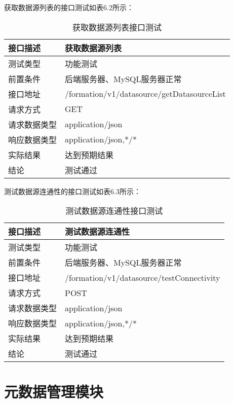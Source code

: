 获取数据源列表的接口测试如表6.2所示：

\begin{table}[h]
  \centering
  \caption{获取数据源列表接口测试}
  \label{tab:exampletable}
  \begin{tabular}{ll}
    \toprule
    接口描述         & 获取数据源列表         \\
    \midrule
    测试类型         & 功能测试         \\
    前置条件         & 后端服务器、MySQL服务器正常         \\
    接口地址       & /formation/v1/datasource/getDatasourceList         \\
    请求方式         & GET      \\
    请求数据类型         & application/json     \\
    响应数据类型         & application/json,*/*           \\
    实际结果         & 达到预期结果           \\
    结论            & 测试通过           \\
    \bottomrule
  \end{tabular}
\end{table}

测试数据源连通性的接口测试如表6.3所示：

\begin{table}[h]
  \centering
  \caption{测试数据源连通性接口测试}
  \label{tab:exampletable}
  \begin{tabular}{ll}
    \toprule
    接口描述         & 测试数据源连通性         \\
    \midrule
    测试类型         & 功能测试         \\
    前置条件         & 后端服务器、MySQL服务器正常         \\
    接口地址       & /formation/v1/datasource/testConnectivity         \\
    请求方式         & POST      \\
    请求数据类型         & application/json     \\
    响应数据类型         & application/json,*/*           \\
    实际结果         & 达到预期结果           \\
    结论            & 测试通过           \\
    \bottomrule
  \end{tabular}
\end{table}

\section{元数据管理模块}

